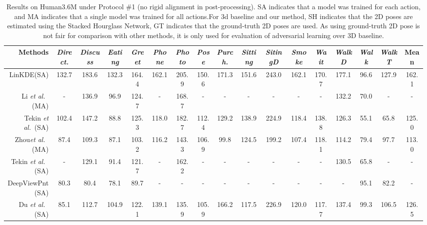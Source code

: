 \documentclass[10pt,journal,compsoc]{IEEEtran}
\begin{document}
\begin{table*}[!t]
 \caption{Results on Human3.6M under Protocol \#1 (no rigid alignment in post-processing). SA indicates that a model was trained for each action, and MA indicates that a single model was trained for all actions.For 3d baseline and our method, SH indicates that the 2D poses are estimated using the Stacked Hourglass Network, GT indicates that the ground-truth 2D poses are used. As using ground-truth 2D pose is not fair for comparison with other methods, it is only used for evaluation of adversarial learning over 3D baseline.}


 \label{tab:Results-on-Human3.6M_no_rigid}
 \small
 \centering
 \setlength{\tabcolsep}{0.96pt}
 \renewcommand{\arraystretch}{1.25}
 \begin{tabular}{ r ||c|c|c|c|c|c|c|c|c|c|c|c|c|c|c||c }
  \hline
   {Methods} & \emph{Direct.} & \emph{Discuss} & \emph{Eating} & \emph{Greet} & \emph{Phone} & \emph{Photo} & \emph{Pose} & \emph{Purch.} & \emph{Sitting} & \emph{SitingD} &\emph{Smoke} &\emph{Wait} &\emph{WalkD} &\emph{Walk} &\emph{WalkT}  &\textbf{Mean} \\
  \hline
  \hline
  LinKDE\cite{ionescu2014human3}(SA) & 132.7 &  183.6  & 132.3  & 164.4  & 162.1  & 205.9  & 150.6 & 171.3 & 151.6 &243.0 & 162.1  & 170.7  & 177.1 & 96.6 & 127.9 &162.1\\
  Li \emph{et al.}~\cite{li2015maximum} (MA) & - &  136.9  & 96.9  & 124.7  & -  & 168.7  & - & - & - &- & -  & -  & 132.2 & 70.0 & - &-\\
  Tekin \emph{et al.}~\cite{tekin2016direct}(SA)  & 102.4 &  147.2  & 88.8  & 125.3  & 118.0  & 182.7  & 112.4 & 129.2 & 138.9 &224.9 & 118.4  & 138.8  & 126.3 & 55.1 & 65.8 &125.0\\
  Zhou\emph{et al.}~\cite{conf/cvpr/HuR16} (MA) & 87.4 &  109.3  & 87.1  & 103.2  & 116.2  & 143.3  & 106.9 & 99.8 & 124.5 &199.2 & 107.4  & 118.1  & 114.2 & 79.4 & 97.7 &113.0\\
  Tekin \emph{et al.}~\cite{tekin2016structured} (SA) & - &  129.1  & 91.4  & 121.7  & -  & 162.2  & - & - & - &- & -  & -  & 130.5 & 65.8 & - &-\\
  DeepViewPnt \cite{ghezelghieh2016learning} (SA) & 80.3 &  80.4  & 78.1  & 89.7  & -  & -  & - & - & - &- & -  & -  & - & 95.1 & 82.2 &-\\
  Du \emph{et al.}~\cite{du2016marker} (SA) & 85.1 &  112.7  & 104.9 & 122.1  & 139.1  & 135.9  & 105.9 & 166.2 & 117.5 &226.9 & 120.0  & 117.7  & 137.4 & 99.3 & 106.5 &126.5\\

\end{tabular}
\end{table*}
\end{document}
